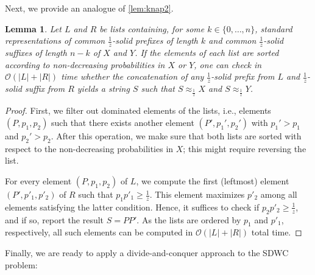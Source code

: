 \documentclass{article}
\theoremstyle{plain}
\newtheorem{lemma}[theorem]{Lemma}
\theoremstyle{definition}
\newcommand{\SDWC}{\textsc{SDWC}\xspace}
\newcommand{\Oh}{\mathcal{O}}
\newcommand{\fr}{\ensuremath{\frac1z}}
\newcommand{\match}{\approx_{\frac1z}}
\newcommand{\mayqed}{}
\begin{document}
 	  Next, we provide an analogue of \cref{lem:knap2}.
      \begin{lemma}\label{lem:meet}
        Let $L$ and $R$ be lists containing, for some $k\in\{0,\ldots,n\}$, standard representations of common \fr-solid prefixes of length $k$ and
        common \fr-solid suffixes of length $n-k$ of $X$ and $Y$.
        If the elements of each list are sorted according to non-decreasing probabilities in $X$ or $Y$,
        one can check in $\Oh(|L|+|R|)$ time whether the concatenation of any \fr-solid prefix from $L$
        and \fr-solid suffix from $R$ yields a string $S$ such that $S \match X$ and $S \match Y$.
      \end{lemma}
      \begin{proof}
        First, we filter out dominated elements of the lists, i.e., elements $(P,p_1,p_2)$ such that there exists
        another element $(P',p_1',p_2')$ with $p_1'> p_1$ and $p_2'> p_2$. 
        After this operation,  we make sure that both lists are sorted with respect to the non-decreasing probabilities in $X$;
        this might require reversing the list.
        
        
      
        For every element $(P,p_1,p_2)$ of $L$, we compute the first (leftmost) element $(P',p'_1,p'_2)$ of $R$
        such that $p_1 p'_1 \ge \frac1z$. This element maximizes $p'_2$ among all elements satisfying the latter condition.
        Hence, it suffices to check if $p_2 p'_2 \ge \frac1z$, and if so, report the result $S=PP'$.
        As the lists are ordered by $p_1$ and $p'_1$, respectively, all such elements
        can be computed in $\Oh(|L|+|R|)$ total time.
      \mayqed\end{proof}

      Finally, we are ready to apply a divide-and-conquer approach to the \SDWC problem:
\end{document}
